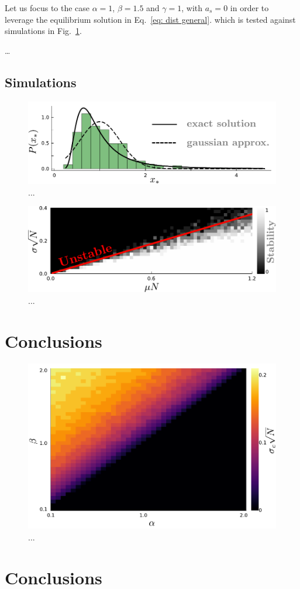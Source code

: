 \documentclass[%
 reprint,
 amsmath,amssymb,
 aps,
]{revtex4-2}
\begin{document}
Let us focus to the case $\alpha=1$, $\beta=1.5$ and $\gamma=1$, with
$a_s=0$ in order to leverage the equilibrium solution in Eq.~\eqref{eq: dist general}.
which is tested against simulations in Fig.~\ref{fig: cavity sol.}.

\dots

\subsection{Simulations}

\begin{figure}[h!]
    \centering
    \includegraphics[width=.45\textwidth]{figs/cavity.pdf}
        \caption{...}
        \label{fig: cavity sol.}
    \end{figure}

\begin{figure}[h!]
\centering
\includegraphics[width=.45\textwidth]{figs/beta1_5-S50-N10-diversity.pdf}
    \caption{...}
    \label{fig: stability line + sims}
\end{figure}

\section{Conclusions}

\begin{figure}[h!]
    \centering
    \includegraphics[width=.45\textwidth]{figs/alpha-beta.pdf}
        \caption{...}
        \label{fig: alpha-beta}
    \end{figure}
    
    \section{Conclusions}
\end{document}
